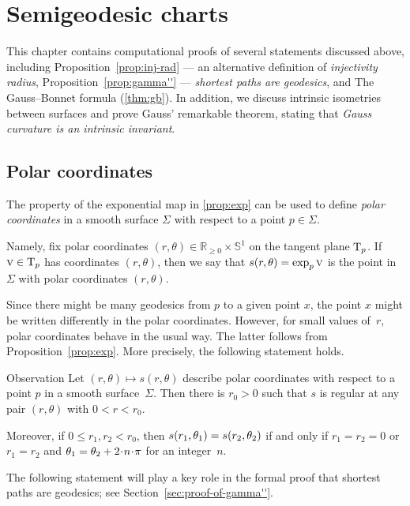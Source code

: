 \chapter{Semigeodesic charts}
\label{chap:semigeodesic}

This chapter contains computational proofs of several statements discussed above, including 
Proposition~\ref{prop:inj-rad} --- an alternative definition of \textit{injectivity radius},
Proposition~\ref{prop:gamma''} --- \textit{shortest paths are geodesics}, and
The Gauss--Bonnet formula (\ref{thm:gb}).
In addition, we discuss intrinsic isometries between surfaces and prove Gauss' remarkable theorem, stating that \textit{Gauss curvature is an intrinsic invariant}.

\section{Polar coordinates}

The property of the exponential map in \ref{prop:exp} can be used to define \emph{polar coordinates} in a smooth surface $\Sigma$ with respect to a point $p\in \Sigma$.

Namely, fix polar coordinates $(r,\theta) \in \mathbb{R}_{\ge0} \times \mathbb{S}^1  $ on the tangent plane $\mathrm{T}_p$.
If $\text{\sc{v}}\in \mathrm{T}_p$ has coordinates $(r,\theta)$,
then we say that $s(r,\theta)\z=\exp_p\vec v$ is the point in $\Sigma$ with  polar coordinates $(r,\theta)$.


Since there might be many geodesics from $p$ to a given point $x$,
the point $x$ might be written differently in the polar coordinates.
However, for small values of~$r$,
polar coordinates behave in the usual way.
The latter follows from Proposition~\ref{prop:exp}.
More precisely, the following statement holds.

\begin{thm}{Observation}\label{obs:polar}
Let $(r,\theta)\mapsto s(r,\theta)$ describe polar coordinates with respect to a point $p$ in a  smooth surface~$\Sigma$.
Then there is $r_0>0$ such that $s$ is  regular at any pair $(r,\theta)$ with $0<r<r_0$.

Moreover, if $0\le r_1,r_2<r_0$, then $s(r_1,\theta_1) \z= s(r_2,\theta_2)$ if and only if
$r_1=r_2=0$ or $r_1=r_2$ and $\theta_1\z=\theta_2+2\cdot n\cdot\pi$ for an integer~$n$.
\end{thm}

The following statement will play a key role in the formal proof that shortest paths are geodesics; see Section~\ref{sec:proof-of-gamma''}.

